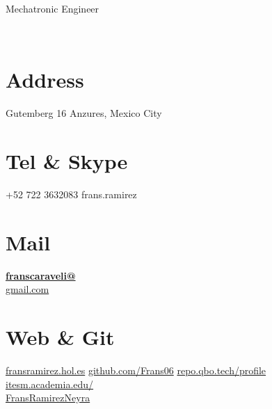 \documentclass[]{friggeri-cv}
\begin{document}
      {Mechatronic Engineer}
      

\begin{aside}
	~
	~
	~
	~
	~
	~
	~
  \section{Address}
    Gutemberg 16
    Anzures, Mexico City
    ~
  \section{Tel \& Skype}
    +52 722 3632083
    frans.ramirez
    ~
  \section{Mail}
    \href{mailto:franscaraveli@gmail.com}{\textbf{franscaraveli@}\\gmail.com}
    ~
  \section{Web \& Git}
    \href{http://fransramirez.com}{fransramirez.hol.es}
    \href{https://github.com/Frans06}{github.com/Frans06}
    \href{https://repo.qbo.tech:5443/profile}{repo.qbo.tech/profile}
    \href{https://itesm.academia.edu/FransRamirezNeyra}{itesm.academia.edu/\\FransRamirezNeyra}
\end{aside}
\end{document}

